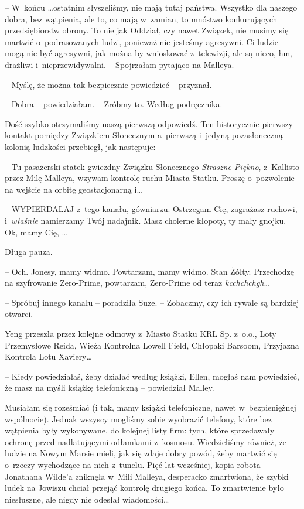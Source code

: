 \documentclass[oneside,polish,11pt,sfheadings]{mwbk}
\begin{document}
-- W~końcu \ldots  ostatnim słyszeliśmy, nie mają tutaj państwa. Wszystko dla
naszego dobra, bez wątpienia, ale to, co mają w~zamian, to mnóstwo
konkurujących przedsiębiorstw obrony. To nie jak Oddział, czy nawet
Związek, nie musimy się martwić o~podrasowanych ludzi, ponieważ nie
jesteśmy agresywni. Ci ludzie mogą nie być agresywni, jak można by
wnioskować z~telewizji, ale są nieco, hm, drażliwi i~nieprzewidywalni. -- Spojrzałam pytająco na Malleya.

-- Myślę, że można tak bezpiecznie powiedzieć -- przyznał.

-- Dobra -- powiedziałam. -- Zróbmy to. Według podręcznika.

Dość szybko otrzymaliśmy naszą pierwszą odpowiedź. Ten historycznie
pierwszy kontakt pomiędzy Związkiem Słonecznym a~pierwszą i~jedyną
pozasłoneczną kolonią ludzkości przebiegł, jak następuje:

-- Tu pasażerski statek gwiezdny Związku Słonecznego \textit{Straszne
Piękno}, z~Kallisto przez Milę Malleya, wzywam kontrolę ruchu Miasta
Statku. Proszę o~pozwolenie na wejście na orbitę geostacjonarną i\ldots 

-- WYPIERDALAJ z~tego kanału, gówniarzu. Ostrzegam Cię, zagrażasz
ruchowi, i~\textit{właśnie} namierzamy Twój nadajnik. Masz cholerne
kłopoty, ty mały gnojku. Ok, mamy Cię, \ldots 

Długa pauza. 

-- Och. Jonesy, mamy widmo. Powtarzam, mamy widmo. Stan
Żółty. Przechodzę na szyfrowanie Zero-Prime, powtarzam, Zero-Prime od
teraz \textit{kcchchchgh}\ldots 

-- Spróbuj innego kanału -- poradziła Suze. -- Zobaczmy, czy ich rywale są
bardziej otwarci.

Yeng przeszła przez kolejne odmowy z~Miasto Statku KRL Sp. z~o.o., Loty
Przemysłowe Reida, Wieża Kontrolna Lowell Field, Chłopaki Barsoom,
Przyjazna Kontrola Lotu Xaviery\ldots 

-- Kiedy powiedziałaś, żeby działać według książki, Ellen, mogłaś nam
powiedzieć, że masz na myśli książkę telefoniczną -- powiedział Malley.

Musiałam się roześmiać (i tak, mamy książki telefoniczne, nawet w~bezpieniężnej wspólnocie). Jednak wszyscy mogliśmy sobie wyobrazić
telefony, które bez wątpienia były wykonywane, do kolejnej listy firm:
tych, które sprzedawały ochronę przed nadlatującymi odłamkami z~kosmosu.
Wiedzieliśmy również, że ludzie na Nowym Marsie mieli, jak się zdaje
dobry powód, żeby martwić się o~rzeczy wychodzące na nich z~tunelu. Pięć
lat wcześniej, kopia robota Jonathana Wilde'a zniknęła w~Mili Malleya,
desperacko zmartwiona, że szybki ludek na Jowiszu chciał przejąć
kontrolę drugiego końca. To zmartwienie było niesłuszne, ale nigdy nie
odesłał wiadomości\ldots 
\end{document}
